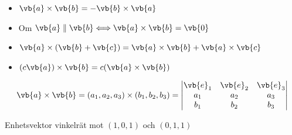 \begin{itemize}
  \item $\vb{a} \times \vb{b} = -\vb{b} \times \vb{a}$
  \item Om $\vb{a} \parallel \vb{b} \Longleftrightarrow \vb{a} \times \vb{b} = \vb{0}$
  \item $\vb{a} \times (\vb{b} + \vb{c}) = \vb{a} \times \vb{b} + \vb{a} \times \vb{c}$
  \item $(c\vb{a}) \times \vb{b} = c(\vb{a} \times \vb{b})$
\end{itemize}
\[ \vb{a} \times \vb{b} = (a_1, a_2, a_3) \times (b_1, b_2, b_3) = \begin{vmatrix} \vb{e}_1 & \vb{e}_2 & \vb{e}_3 \\ a_1 & a_2 & a_3 \\ b_1 & b_2 & b_3 \end{vmatrix} \]

\begin{example}[1.7]
Enhetsvektor vinkelrät mot $(1, 0, 1)$ och $(0, 1, 1)$
\end{example}
